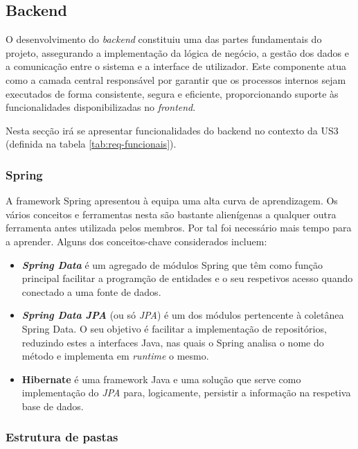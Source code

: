 \subsection{Backend}

O desenvolvimento do \textit{backend} constituiu uma das partes fundamentais do projeto, assegurando a implementação da lógica de negócio, a gestão dos dados e a comunicação entre o sistema e a interface de utilizador. Este componente atua como a camada central responsável por garantir que os processos internos sejam executados de forma consistente, segura e eficiente, proporcionando suporte às funcionalidades disponibilizadas no \textit{frontend}.  

Nesta secção irá se apresentar funcionalidades do backend no contexto da US3 (definida na tabela \ref{tab:req-funcionais}).

\subsubsection{Spring}

A framework Spring apresentou à equipa uma alta curva de aprendizagem. Os vários conceitos e ferramentas nesta são bastante alienígenas a qualquer outra ferramenta antes utilizada pelos membros. Por tal foi necessário mais tempo para a aprender. Alguns dos conceitos-chave considerados incluem:

\begin{itemize}
    \item \textbf{\textit{Spring Data}} é um agregado de módulos Spring que têm como função principal facilitar a programção de entidades e o seu respetivos acesso quando conectado a uma fonte de dados.
    \item \textbf{\textit{Spring Data JPA}} (ou só \textit{JPA}) é um dos módulos pertencente à coletânea Spring Data. O seu objetivo é facilitar a implementação de repositórios, reduzindo estes a interfaces Java, nas quais o Spring analisa o nome do método e implementa em \textit{runtime} o mesmo. 
    \item \textbf{\gls{Hibernate}} \cite{docs-hibernate} é uma framework Java e uma solução  que serve como implementação do \textit{JPA} para, logicamente, persistir a informação na respetiva base de dados.
\end{itemize}

\subsubsection{Estrutura de pastas}

